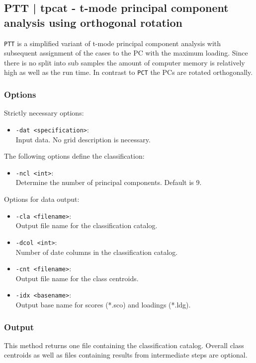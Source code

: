 \documentclass[12pt, oneside, a4paper, headsepline, plainheadsepline]{scrbook}
\begin{document}
\subsection{PTT | tpcat - t-mode principal component analysis using orthogonal rotation}
\verb+PTT+ is a simplified variant of t-mode principal component analysis with subsequent assignment of the cases to the PC with the maximum loading. Since there is no split into sub samples the amount of computer memory is relatively high as well as the run time. In contrast to \verb+PCT+ the PCs are rotated orthogonally. 

\subsubsection*{Options}
Strictly necessary options:
\begin{itemize}
 \item \verb+-dat <specification>+:\\ Input data. No grid description is necessary.
\end{itemize}
The following options define the classification:
\begin{itemize}
 \item \verb+-ncl <int>+:\\ Determine the number of principal components. Default is 9.
\end{itemize}
Options for data output:
\begin{itemize}
 \item \verb+-cla <filename>+:\\ Output file name for the classification catalog.
 \item \verb+-dcol <int>+:\\ Number of date columns in the classification catalog.
 \item \verb+-cnt <filename>+:\\ Output file name for the class centroids.
 \item \verb+-idx <basename>+:\\ Output base name for scores (*.sco) and loadings (*.ldg).
\end{itemize}

\subsubsection*{Output}
This method returns one file containing the classification catalog. 
Overall class centroids as well as files containing results from intermediate steps are optional.
\end{document}
